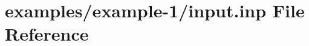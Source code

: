 \hypertarget{input_8inp}{}\section{examples/example-\/1/input.inp File Reference}
\label{input_8inp}
